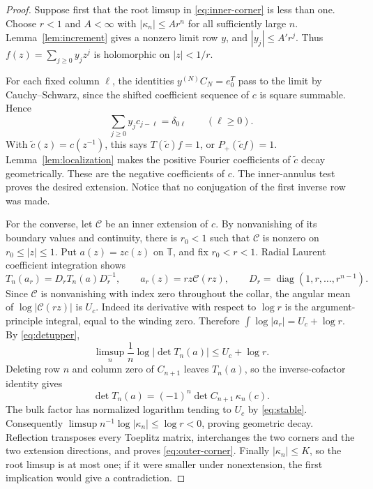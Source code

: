 \documentclass[11pt]{article}
\theoremstyle{definition}
\newcommand{\T}{\mathbb T}
\newcommand{\diag}{\operatorname{diag}}
\begin{document}
\begin{proof}
Suppose first that the root limsup in \eqref{eq:inner-corner} is less than one. Choose $r<1$ and $A<\infty$ with $|\kappa_n|\le Ar^n$ for all sufficiently large $n$. Lemma~\ref{lem:increment} gives a nonzero limit row $y$, and $|y_j|\le A' r^j$. Thus
$f(z)=\sum_{j\ge0}y_jz^j$ is holomorphic on $|z|<1/r$.

For each fixed column $\ell$, the identities $y^{(N)}C_N=e_0^T$ pass to the limit by Cauchy--Schwarz, since the shifted coefficient sequence of $c$ is square summable. Hence
\[
 \sum_{j\ge0}y_jc_{j-\ell}=\delta_{0\ell}\qquad(\ell\ge0).
\]
With $\widetilde c(z)=c(z^{-1})$, this says $T(\widetilde c)f=1$, or $P_+(\widetilde c f)=1$. Lemma~\ref{lem:localization} makes the positive Fourier coefficients of $\widetilde c$ decay geometrically. These are the negative coefficients of $c$. The inner-annulus test proves the desired extension. Notice that no conjugation of the first inverse row was made.

For the converse, let $\mathcal C$ be an inner extension of $c$. By nonvanishing of its boundary values and continuity, there is $r_0<1$ such that $\mathcal C$ is nonzero on $r_0\le|z|\le1$. Put $a(z)=zc(z)$ on $\T$, and fix $r_0<r<1$. Radial Laurent coefficient integration shows
\[
 T_n(a_r)=D_rT_n(a)D_r^{-1},\qquad
 a_r(z)=rz\mathcal C(rz),\qquad D_r=\diag(1,r,\ldots,r^{n-1}).
\]
Since $\mathcal C$ is nonvanishing with index zero throughout the collar, the angular mean of $\log|\mathcal C(rz)|$ is $U_c$. Indeed its derivative with respect to $\log r$ is the argument-principle integral, equal to the winding zero. Therefore $\int\log|a_r|=U_c+\log r$. By \eqref{eq:detupper},
\[
 \limsup_n\frac1n\log|\det T_n(a)|\le U_c+\log r.
\]
Deleting row $n$ and column zero of $C_{n+1}$ leaves $T_n(a)$, so the inverse-cofactor identity gives
\begin{equation}
 \det T_n(a)=(-1)^n\det C_{n+1}\,\kappa_n(c).
 \label{eq:cofactor}
\end{equation}
The bulk factor has normalized logarithm tending to $U_c$ by \eqref{eq:stable}. Consequently $\limsup n^{-1}\log|\kappa_n|\le\log r<0$, proving geometric decay. Reflection transposes every Toeplitz matrix, interchanges the two corners and the two extension directions, and proves \eqref{eq:outer-corner}. Finally $|\kappa_n|\le K$, so the root limsup is at most one; if it were smaller under nonextension, the first implication would give a contradiction.
\end{proof}
\end{document}
